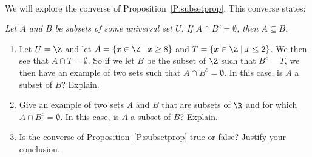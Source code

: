 \begin{activity} \label{A:converseprop} \hfill \\
We will explore the converse of Proposition~\ref{P:subsetprop}.  This converse states:

\begin{list}{}
\item \emph{Let $A$ and $B$ be subsets of some universal set $U$\!.  If $A \cap B^c = \emptyset$, then $A \subseteq B$}.
\end{list}

\begin{enumerate}
\item Let $U = \Z$ and let $A = \left\{ x \in \Z \mid x \geq 8 \right\}$ and 
$T = \left\{ x \in \Z \mid x \leq 2 \right\}$.  We then see that $A \cap T = \emptyset$.  So if we let $B$ be the subset of $\Z$ such that $B^c = T$, we then have an example of two sets such that $A \cap B^c = \emptyset$.  In this case, is $A$ a subset of $B$?  Explain.

\item Give an example of two sets $A$ and $B$ that are subsets of $\R$ and for which 
$A \cap B^c = \emptyset$.  In this case, is $A$ a subset of $B$?  Explain.

\item Is the converse of Proposition~\ref{P:subsetprop} true or false?  Justify your conclusion.
\end{enumerate}
\end{activity}
\hbreak




\endinput

